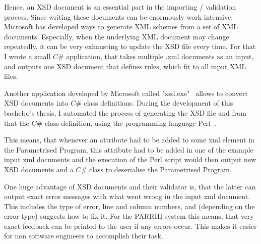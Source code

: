 Hence, an XSD document is an essential part in the importing / validation process. Since writing these documents can be enormously work intensive, Microsoft has developed ways to generate XML schemes from a set of XML documents. Especially, when the underlying XML document may change repeatedly, it can be very exhausting to update the XSD file every time. For that I wrote a small $C\#$ application, that takes multiple .xml documents as an input, and outputs one XSD document that defines rules, which fit to all input XML files. 

Another application developed by Microsoft called "xsd.exe"~\cite{xsdExe} allows to convert XSD documents into $C\#$ class definitions. During the development of this bachelor's thesis, I automated the process of generating the XSD file and from that the $C\#$ class definition, using the programming language Perl~\cite{perl}.

This means, that whenever an attribute had to be added to some xml element in the Parametrised Program, this attribute had to be added in one of the example input xml documents and the execution of the Perl script would then output new XSD documents and a $C\#$ class to deserialise the Parametrised Program. 

One huge advantage of XSD documents and their validator is, that the latter can output exact error messages with what went wrong in the input xml document. This includes the type of error, line and column numbers, and (depending on the error type) suggests how to fix it. For the PARRHI system this means, that very exact feedback can be printed to the user if any errors occur. This makes it easier for non software engineers to accomplish their task.




















